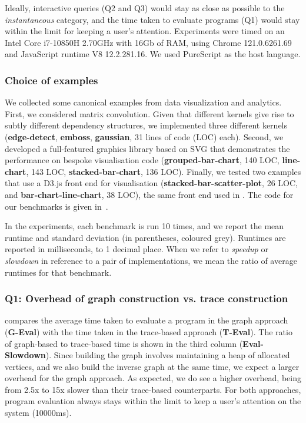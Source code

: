 \noindent Ideally, interactive queries (Q2 and Q3) would stay as close as possible to the \emph{instantaneous}
category, and the time taken to evaluate programs (Q1) would stay within the limit for keeping a user's
attention. Experiments were timed on an Intel Core i7-10850H 2.70GHz with 16Gb of RAM, using Chrome
121.0.6261.69 and JavaScript runtime V8 12.2.281.16. We used PureScript as the host language.

\subsubsection{Choice of examples}
\label{sec:evaluation:choice-of-examples}

We collected some canonical examples from data visualization and analytics. First,
we considered matrix convolution. Given that different kernels give rise to subtly different dependency
structures, we implemented three different kernels (\textbf{edge-detect}, \textbf{emboss}, \textbf{gaussian},
31 lines of code (LOC) each). Second, we developed a full-featured graphics library based on SVG that
demonstrates the performance on bespoke visualisation code (\textbf{grouped-bar-chart}, 140 LOC,
\textbf{line-chart}, 143 LOC, \textbf{stacked-bar-chart}, 136 LOC). Finally, we tested two examples that use a
D3.js front end for visualisation (\textbf{stacked-bar-scatter-plot}, 26 LOC, and
\textbf{bar-chart-line-chart}, 38 LOC), the same front end used in
. The code for our benchmarks is given
in~.

In the experiments, each benchmark is run 10 times, and we report the mean runtime and standard deviation (in
parentheses, coloured grey). Runtimes are reported in milliseconds, to 1 decimal place. When we refer to
\textit{speedup} or \textit{slowdown} in reference to a pair of implementations, we mean the ratio of average
runtimes for that benchmark.

\subsubsection{Q1: Overhead of graph construction vs. trace construction}

 compares the average time taken to evaluate a program in the graph approach
(\textbf{G-Eval}) with the time taken in the trace-based approach (\textbf{T-Eval}). The ratio of graph-based
to trace-based time is shown in the third column (\textbf{Eval-Slowdown}). Since building the graph involves
maintaining a heap of allocated vertices, and we also build the inverse graph at the same time, we expect a
larger overhead for the graph approach. As expected, we do see a higher overhead, being from 2.5x to 15x
slower than their trace-based counterparts. For both approaches, program evaluation always stays within the
limit to keep a user’s attention on the system (10000ms).

